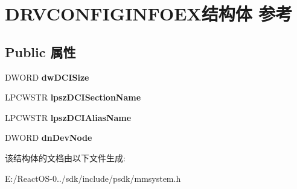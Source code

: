 \hypertarget{struct_d_r_v_c_o_n_f_i_g_i_n_f_o_e_x}{}\section{D\+R\+V\+C\+O\+N\+F\+I\+G\+I\+N\+F\+O\+E\+X结构体 参考}
\label{struct_d_r_v_c_o_n_f_i_g_i_n_f_o_e_x}
\subsection*{Public 属性}
\begin{DoxyCompactItemize}
\item 
\mbox{\label{struct_d_r_v_c_o_n_f_i_g_i_n_f_o_e_x_ad4b03e6b28623d1d4f5542231fd474dc}} 
D\+W\+O\+RD {\bfseries dw\+D\+C\+I\+Size}
\item 
\mbox{\label{struct_d_r_v_c_o_n_f_i_g_i_n_f_o_e_x_aef6306f418bb6cc114b8154d33093303}} 
L\+P\+C\+W\+S\+TR {\bfseries lpsz\+D\+C\+I\+Section\+Name}
\item 
\mbox{\label{struct_d_r_v_c_o_n_f_i_g_i_n_f_o_e_x_ad2f437095d10113d9cd84dcce94d1e2a}} 
L\+P\+C\+W\+S\+TR {\bfseries lpsz\+D\+C\+I\+Alias\+Name}
\item 
\mbox{\label{struct_d_r_v_c_o_n_f_i_g_i_n_f_o_e_x_a7dcbea75a29ef610cd570f488bedeb16}} 
D\+W\+O\+RD {\bfseries dn\+Dev\+Node}
\end{DoxyCompactItemize}


该结构体的文档由以下文件生成\+:\begin{DoxyCompactItemize}
\item 
E\+:/\+React\+O\+S-\/0../sdk/include/psdk/mmsystem.\+h\end{DoxyCompactItemize}
